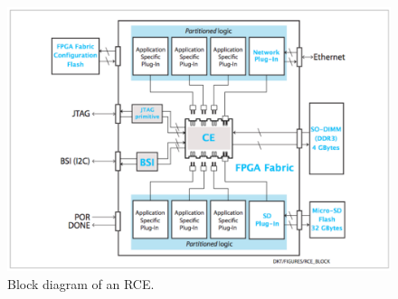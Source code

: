 \begin{figure}[tbh]
\includegraphics[scale=0.8]{rce-block.pdf}
\caption{Block diagram of an RCE.}
\label{fig:RCEblock}
\end{figure} 

